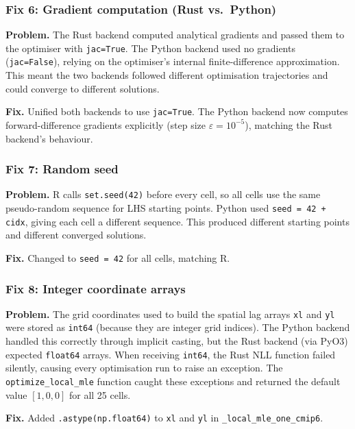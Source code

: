 \documentclass[12pt,a4paper]{article}
\begin{document}
\subsubsection{Fix 6: Gradient computation (Rust vs.\ Python)}

\textbf{Problem.}
The Rust backend computed analytical gradients and passed them to
the optimiser with \texttt{jac=True}.  The Python backend used no
gradients (\texttt{jac=False}), relying on the optimiser's
internal finite-difference approximation.  This meant the two
backends followed different optimisation trajectories and could
converge to different solutions.

\textbf{Fix.}
Unified both backends to use \texttt{jac=True}.  The Python
backend now computes forward-difference gradients explicitly
(step size $\varepsilon = 10^{-5}$), matching the Rust backend's
behaviour.

\subsubsection{Fix 7: Random seed}

\textbf{Problem.}
R calls \texttt{set.seed(42)} before every cell, so all cells
use the same pseudo-random sequence for LHS starting points.
Python used \texttt{seed = 42 + cidx}, giving each cell a
different sequence.  This produced different starting points
and different converged solutions.

\textbf{Fix.}
Changed to \texttt{seed = 42} for all cells, matching R.

\subsubsection{Fix 8: Integer coordinate arrays}

\textbf{Problem.}
The grid coordinates used to build the spatial lag arrays
\texttt{xl} and \texttt{yl} were stored as \texttt{int64}
(because they are integer grid indices).  The Python backend
handled this correctly through implicit casting, but the Rust
backend (via PyO3) expected \texttt{float64} arrays.  When
receiving \texttt{int64}, the Rust NLL function failed silently,
causing every optimisation run to raise an exception.  The
\texttt{optimize\_local\_mle} function caught these exceptions
and returned the default value $[1, 0, 0]$ for all 25 cells.

\textbf{Fix.}
Added \texttt{.astype(np.float64)} to \texttt{xl} and
\texttt{yl} in \texttt{\_local\_mle\_one\_cmip6}.
\end{document}
